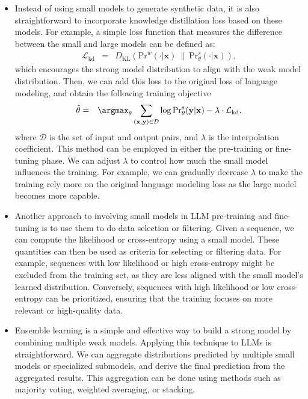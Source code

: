\begin{itemize}
\item \vspace{0.5em} Instead of using small models to generate synthetic data, it is also straightforward to incorporate knowledge distillation loss based on these models. For example, a simple loss function that measures the difference between the small and large models can be defined as:
    \begin{eqnarray}
    \mathcal{L}_{\mathrm{kd}} & = & D_{\mathrm{KL}}(\mathrm{Pr}^{w}(\cdot|\mathbf{x})\ \|\ \mathrm{Pr}^{s}_{\theta}(\cdot|\mathbf{x})),
    \end{eqnarray}
    \noindent which encourages the strong model distribution to align with the weak model distribution. Then, we can add this loss to the original loss of language modeling, and obtain the following training objective
    \begin{eqnarray}
    \tilde{\theta} & = & \argmax_{\theta} \sum_{(\mathbf{x},\mathbf{y}) \in \mathcal{D}} \log \mathrm{Pr}_{\theta}^{s}(\mathbf{y}|\mathbf{x}) - \lambda \cdot \mathcal{L}_{\mathrm{kd}},
    \end{eqnarray}
    \noindent where $\mathcal{D}$ is the set of input and output pairs, and $\lambda$ is the interpolation coefficient. This method can be employed in either the pre-training or fine-tuning phase. We can adjust $\lambda$ to control how much the small model influences the training. For example, we can gradually decrease $\lambda$ to make the training rely more on the original language modeling loss as the large model becomes more capable.
\item \vspace{0.3em} Another approach to involving small models in LLM pre-training and fine-tuning is to use them to do data selection or filtering. Given a sequence, we can compute the likelihood or cross-entropy using a small model. These quantities can then be used as criteria for selecting or filtering data. For example, sequences with low likelihood or high cross-entropy might be excluded from the training set, as they are less aligned with the small model's learned distribution. Conversely, sequences with high likelihood or low cross-entropy can be prioritized, ensuring that the training focuses on more relevant or high-quality data.
\item \vspace{0.3em} Ensemble learning is a simple and effective way to build a strong model by combining multiple weak models. Applying this technique to LLMs is straightforward. We can aggregate distributions predicted by multiple small models or specialized submodels, and derive the final prediction from the aggregated results. This aggregation can be done using methods such as majority voting, weighted averaging, or stacking.

\end{itemize}
